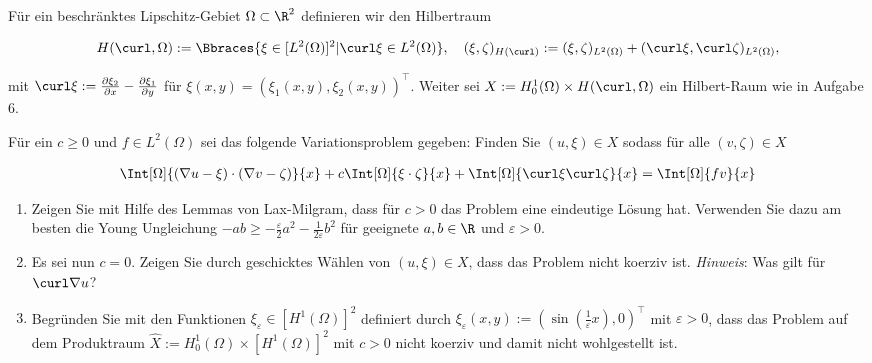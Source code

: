 
\begin{exercise}

Für ein beschränktes Lipschitz-Gebiet $\Omega \subset \R^2$ definieren wir den Hilbertraum

\begin{align*}
  H(\curl, \Omega)
  :=
  \Bbraces{\xi \in [L^2(\Omega)]^2 | \curl \xi \in L^2(\Omega)}, 
  \quad
  (\xi, \zeta)_{H(\curl)}
  :=
  (\xi, \zeta)_{L^2(\Omega)} + (\curl \xi, \curl \zeta)_{L^2(\Omega)}, 
\end{align*}

mit $\curl \xi := \frac{\partial \xi_2}{\partial x} - \frac{\partial \xi_1}{\partial y}$ für $\xi(x, y) = (\xi_1(x, y), \xi_2(x, y))^\top$.
Weiter sei $X := H^1_0(\Omega) \times H(\curl, \Omega)$ ein Hilbert-Raum wie in Aufgabe 6.

Für ein $c \geq 0$ und $f \in L^2(\Omega)$ sei das folgende Variationsproblem gegeben: Finden Sie $(u, \xi) \in X$ sodass für alle $(v, \zeta) \in X$

\begin{align}
  \Int[\Omega]{(\nabla u - \xi) \cdot (\nabla v - \zeta)}{x}
  +
  c \Int[\Omega]{\xi \cdot \zeta}{x}
  +
  \Int[\Omega]{\curl \xi \curl \zeta}{x}
  =
  \Int[\Omega]{f v}{x}
\end{align}

\begin{enumerate}[label = \textbf{\alph*)}]

  \item Zeigen Sie mit Hilfe des Lemmas von Lax-Milgram, dass für $c > 0$ das Problem eine eindeutige Lösung hat.
  Verwenden Sie dazu am besten die Young Ungleichung $-ab \geq - \frac{\varepsilon}{2} a^2 - \frac{1}{2\varepsilon}b^2$ für geeignete $a, b \in \R$ und $\varepsilon > 0$.

  \item Es sei nun $c = 0$.
  Zeigen Sie durch geschicktes Wählen von $(u, \xi) \in X$, dass das Problem nicht koerziv ist.
  \textit{Hinweis}:
  Was gilt für $\curl \nabla u$?

  \item Begründen Sie mit den Funktionen $\xi_\varepsilon \in [H^1(\Omega)]^2$ definiert durch $\xi_\varepsilon(x, y) := (\sin(\frac{1}{\varepsilon}x), 0)^\top$ mit $\varepsilon > 0$, dass das Problem auf dem Produktraum $\hat{X} := H^1_0(\Omega) \times [H^1(\Omega)]^2$ mit $c > 0$ nicht koerziv und damit nicht wohlgestellt ist.

\end{enumerate}

\end{exercise}

